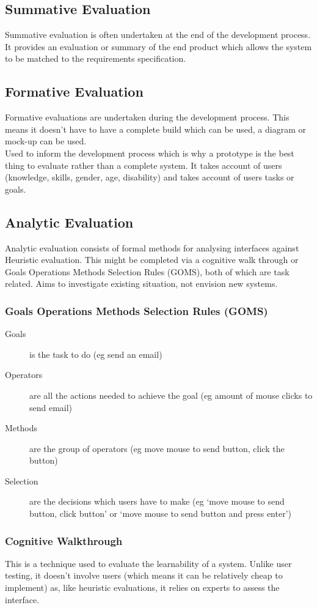 \subsection*{Summative Evaluation}
Summative evaluation is often undertaken at the end of the development process. It provides an evaluation or summary of the end product which allows the system to be matched to the requirements specification.

\subsection*{Formative Evaluation}
Formative evaluations are undertaken during the development process. This means it doesn't have to have a complete build which can be used, a diagram or mock-up can be used.\\
Used to inform the development process which is why a prototype is the best thing to evaluate rather than a complete system. It takes account of users (knowledge, skills, gender, age, disability) and takes account of users tasks or goals.

\subsection*{Analytic Evaluation}
Analytic evaluation consists of formal methods for analysing interfaces against Heuristic evaluation. This might be completed via a cognitive walk through or Goals Operations Methods Selection Rules (GOMS), both of which are task related. Aims to investigate existing situation, not envision new systems. 
\subsubsection*{Goals Operations Methods Selection Rules (GOMS)}
\begin{description}
    \item[Goals] is the task to do (eg send an email)
    \item[Operators] are all the actions needed to achieve the goal (eg amount of mouse clicks to send email)
    \item[Methods] are the group of operators (eg move mouse to send button, click the button) 
    \item[Selection] are the decisions which users have to make (eg `move mouse to send button, click button' or `move mouse to send button and press enter') 
\end{description}
\subsubsection*{Cognitive Walkthrough}
This is a technique used to evaluate the learnability of a system. Unlike user testing, it doesn't involve users (which means it can be relatively cheap to implement) as, like heuristic evaluations, it relies on experts to assess the interface.

